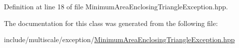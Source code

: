 Definition at line 18 of file Minimum\-Area\-Enclosing\-Triangle\-Exception.\-hpp.



The documentation for this class was generated from the following file\-:\begin{DoxyCompactItemize}
\item 
include/multiscale/exception/\hyperlink{MinimumAreaEnclosingTriangleException_8hpp}{Minimum\-Area\-Enclosing\-Triangle\-Exception.\-hpp}\end{DoxyCompactItemize}
